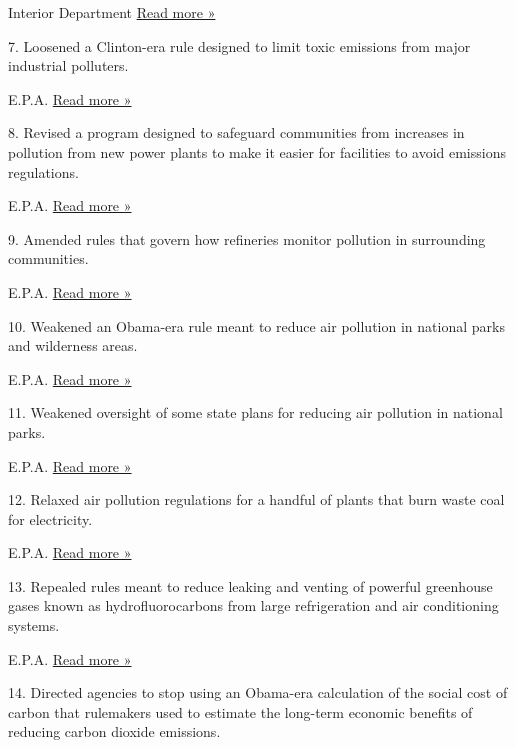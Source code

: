  Interior Department \textbar{}
\href{https://www.nytimes3xbfgragh.onion/2018/09/18/climate/trump-methane-rollback.html}{Read
more »}

7. Loosened a Clinton-era rule designed to limit toxic emissions from
major industrial polluters.

 E.P.A. \textbar{}
\href{https://www.vox.com/energy-and-environment/2018/1/26/16936104/epa-trump-toxic-air-pollution}{Read
more »}

8. Revised a program designed to safeguard communities from increases in
pollution from new power plants to make it easier for facilities to
avoid emissions regulations.

 E.P.A. \textbar{}
\href{https://eelp.law.harvard.edu/2018/12/new-source-review/}{Read more
»}

9. Amended rules that govern how refineries monitor pollution in
surrounding communities.

 E.P.A. \textbar{}
\href{https://eelp.law.harvard.edu/2018/12/petroleum-refinery-sector-rule-neshaps-nsps/}{Read
more »}

10. Weakened an Obama-era rule meant to reduce air pollution in national
parks and wilderness areas.

 E.P.A. \textbar{}
\href{https://www.eenews.net/eenewspm/2019/08/20/stories/1061013699}{Read
more »}

11. Weakened oversight of some state plans for reducing air pollution in
national parks.

 E.P.A. \textbar{}
\href{https://eelp.law.harvard.edu/2018/04/regional-haze-state-implementation-plans/}{Read
more »}

12. Relaxed air pollution regulations for a handful of plants that burn
waste coal for electricity.

 E.P.A. \textbar{}
\href{https://whyy.org/articles/epa-rolls-back-air-regulations-for-waste-coal-plants-in-western-pa-w-va/}{Read
more »}

13. Repealed rules meant to reduce leaking and venting of powerful
greenhouse gases known as hydrofluorocarbons from large refrigeration
and air conditioning systems.

 E.P.A. \textbar{}
\href{https://climate.law.columbia.edu/content/epa-rolls-back-rule-climate-super-pollutants}{Read
more »}

14. Directed agencies to stop using an Obama-era calculation of the
social cost of carbon that rulemakers used to estimate the long-term
economic benefits of reducing carbon dioxide emissions.

